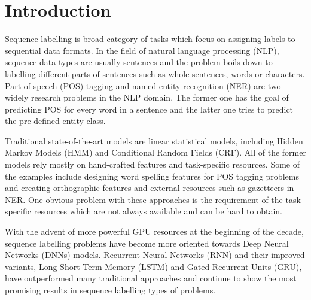 \section{Introduction}
Sequence labelling is broad category of tasks which focus on assigning labels
to sequential data formats. In the field of natural language processing (NLP),
sequence data types are usually sentences and the problem boils down to
labelling different parts of sentences such as whole sentences, words or
characters.  Part-of-speech (POS) tagging and named entity recognition (NER)
are two widely research problems in the NLP domain. The former one has the goal
of predicting POS for every word in a sentence and the latter one tries to 
predict the pre-defined entity class.

Traditional state-of-the-art models are linear statistical models, including
Hidden Markov Models (HMM)\cite{baum1966statistical} and Conditional Random Fields
(CRF)\cite{lafferty2001conditional}. All of the former models rely mostly on hand-crafted features
and task-specific resources. Some of the examples include designing word
spelling features for POS tagging problems and creating orthographic features
and external resources such as gazetteers in NER. One obvious problem with
these approaches is the requirement of the task-specific resources which are not
always available and can be hard to obtain.

With the advent of more powerful GPU resources at the beginning of the decade,
sequence labelling problems have become more oriented towards Deep Neural
Networks (DNNs) models. Recurrent Neural Networks (RNN)\cite{goller1996learning} and their
improved variants, Long-Short Term Memory (LSTM)\cite{hochreiter1997long} and Gated Recurrent
Units (GRU)\cite{cho2014properties}, have outperformed many traditional approaches and
continue to show the most promising results in sequence labelling types of
problems.

